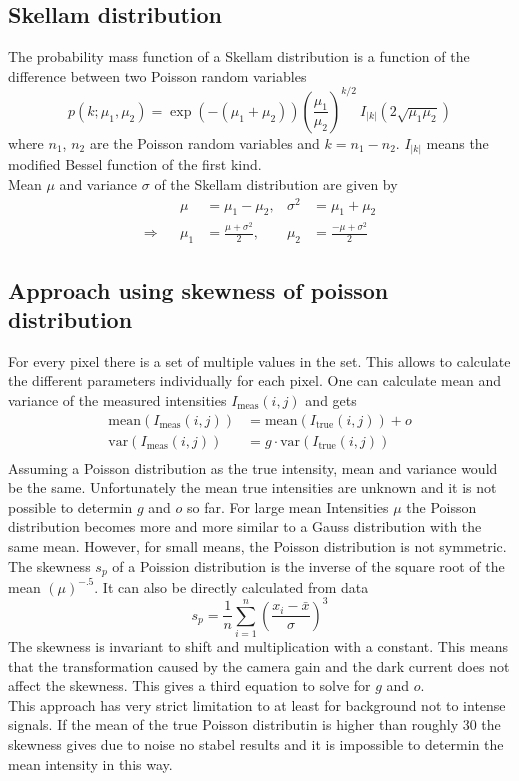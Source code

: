\subsection{Skellam distribution}
The probability
mass function of a Skellam distribution is a function of the difference between
two Poisson random variables
\begin{equation}
	p(k;\mu_1, \mu_2) =
	\exp(-(\mu_1+\mu_2))\left(\frac{\mu_1}{\mu_2}\right)^{k/2}~I_{|k|}\left(2\sqrt{\mu_1
	\mu_2}\right)
\end{equation}  
where $n_1$, $n_2$ are the Poisson random variables and $k = n_1 - n_2$.
$I_{|k|}$ means the modified Bessel function of the first kind.\\
Mean $\mu$ and variance $\sigma$ of the Skellam distribution are given by
\begin{align}
	&&\mu &= \mu_1 - \mu_2,& \sigma^2 &= \mu_1 + \mu_2\\
	\Rightarrow &&\mu_1& = \frac{\mu + \sigma^2}{2},& \mu_2 &=\frac{-\mu +
	\sigma^2}{2}
\end{align} 

\subsection{Approach using skewness of poisson distribution}
For every pixel there is a set of multiple values in the set. This allows to
calculate the different parameters individually for each pixel. One can
calculate mean and variance of the measured intensities $I_\text{meas}(i,j)$ and
gets
\begin{align}
	\text{mean}(I_\text{meas}(i,j))& = \text{mean}(I_\text{true}(i,j)) + o\\
	\text{var}(I_\text{meas}(i,j))& = g\cdot\text{var}(I_\text{true}(i,j))\\
\end{align}
Assuming a Poisson distribution as the true intensity, mean and variance would
be the same. Unfortunately the mean true intensities are unknown and it is
not possible to determin $g$ and $o$ so far. For large mean Intensities $\mu$
the Poisson distribution becomes more and more similar to a Gauss distribution
with the same mean. However, for small means, the Poisson distribution is not
symmetric. The skewness $s_p$ of a Poission distribution is the inverse of the
square root of the mean $(\mu)^{-.5}$. It can also be directly
calculated from data
\begin{equation}
	s_p = \frac{1}{n}\sum_{i = 1}^n \left(\frac{x_i - \bar x}{\sigma}\right)^3
\end{equation}
The skewness is invariant to shift and multiplication with a constant. This
means that the transformation caused by the camera gain and the dark current
does not affect the skewness. This gives a third equation to solve for $g$ and
$o$.\\
This approach has very strict limitation to at least for background not to
intense signals. If the mean of the true Poisson distributin is higher than
roughly 30 the skewness gives due to noise no stabel results and it is
impossible to determin the mean intensity in this way.